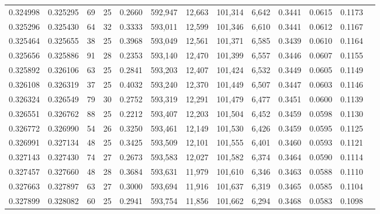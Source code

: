 \begin{tabular}{rrrrrrrrrrrrr}
0.324998 & 0.325295 &  69 &  25 &                                     0.2660 & 592,947 &  12,663 & 101,314 &   6,642 & 0.3441 & 0.0615 & 0.1173 \\
0.325296 & 0.325430 &  64 &  32 &                                     0.3333 & 593,011 &  12,599 & 101,346 &   6,610 & 0.3441 & 0.0612 & 0.1167 \\
0.325464 & 0.325655 &  38 &  25 &                                     0.3968 & 593,049 &  12,561 & 101,371 &   6,585 & 0.3439 & 0.0610 & 0.1164 \\
0.325656 & 0.325886 &  91 &  28 &                                     0.2353 & 593,140 &  12,470 & 101,399 &   6,557 & 0.3446 & 0.0607 & 0.1155 \\
0.325892 & 0.326106 &  63 &  25 &                                     0.2841 & 593,203 &  12,407 & 101,424 &   6,532 & 0.3449 & 0.0605 & 0.1149 \\
0.326108 & 0.326319 &  37 &  25 &                                     0.4032 & 593,240 &  12,370 & 101,449 &   6,507 & 0.3447 & 0.0603 & 0.1146 \\
0.326324 & 0.326549 &  79 &  30 &                                     0.2752 & 593,319 &  12,291 & 101,479 &   6,477 & 0.3451 & 0.0600 & 0.1139 \\
0.326551 & 0.326762 &  88 &  25 &                                     0.2212 & 593,407 &  12,203 & 101,504 &   6,452 & 0.3459 & 0.0598 & 0.1130 \\
0.326772 & 0.326990 &  54 &  26 &                                     0.3250 & 593,461 &  12,149 & 101,530 &   6,426 & 0.3459 & 0.0595 & 0.1125 \\
0.326991 & 0.327134 &  48 &  25 &                                     0.3425 & 593,509 &  12,101 & 101,555 &   6,401 & 0.3460 & 0.0593 & 0.1121 \\
0.327143 & 0.327430 &  74 &  27 &                                     0.2673 & 593,583 &  12,027 & 101,582 &   6,374 & 0.3464 & 0.0590 & 0.1114 \\
0.327457 & 0.327660 &  48 &  28 &                                     0.3684 & 593,631 &  11,979 & 101,610 &   6,346 & 0.3463 & 0.0588 & 0.1110 \\
0.327663 & 0.327897 &  63 &  27 &                                     0.3000 & 593,694 &  11,916 & 101,637 &   6,319 & 0.3465 & 0.0585 & 0.1104 \\
0.327899 & 0.328082 &  60 &  25 &                                     0.2941 & 593,754 &  11,856 & 101,662 &   6,294 & 0.3468 & 0.0583 & 0.1098 \\

\end{tabular}

